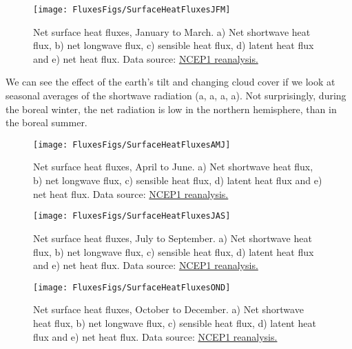 \begin{figure}[htb]
  \centering
  \texttt{[image: FluxesFigs/SurfaceHeatFluxesJFM]}
  \caption{Net surface heat fluxes, January to March.  a) Net shortwave heat flux, b) net longwave flux, c) sensible heat flux, d) latent heat flux and e) net heat flux. 
  Data source:  \href{https://psl.noaa.gov/data/gridded/data.ncep.reanalysis.derived.surfaceflux.html}{NCEP1 reanalysis.}  }
  \label{fig:SurfaceHeatFluxesJFM}
\end{figure}

We can see the effect of the earth's tilt and changing cloud cover if we look at seasonal averages of the shortwave radiation (a, a, a, a).  Not surprisingly, during the boreal winter, the net radiation is low in the northern hemisphere, than in the boreal summer.  

\begin{figure}[htb]
  \centering
  \texttt{[image: FluxesFigs/SurfaceHeatFluxesAMJ]}
  \caption{Net surface heat fluxes, April to June.  a) Net shortwave heat flux, b) net longwave flux, c) sensible heat flux, d) latent heat flux and e) net heat flux. 
  Data source:  \href{https://psl.noaa.gov/data/gridded/data.ncep.reanalysis.derived.surfaceflux.html}{NCEP1 reanalysis.}  }
  \label{fig:SurfaceHeatFluxesAMJ}
\end{figure}

\begin{figure}[htb]
  \centering
  \texttt{[image: FluxesFigs/SurfaceHeatFluxesJAS]}
  \caption{Net surface heat fluxes, July to September.  a) Net shortwave heat flux, b) net longwave flux, c) sensible heat flux, d) latent heat flux and e) net heat flux. 
  Data source:  \href{https://psl.noaa.gov/data/gridded/data.ncep.reanalysis.derived.surfaceflux.html}{NCEP1 reanalysis.}  }
  \label{fig:SurfaceHeatFluxesJAS}
\end{figure}

\begin{figure}[htb]
  \centering
  \texttt{[image: FluxesFigs/SurfaceHeatFluxesOND]}
  \caption{Net surface heat fluxes, October to December.  a) Net shortwave heat flux, b) net longwave flux, c) sensible heat flux, d) latent heat flux and e) net heat flux. 
  Data source:  \href{https://psl.noaa.gov/data/gridded/data.ncep.reanalysis.derived.surfaceflux.html}{NCEP1 reanalysis.}  }
  \label{fig:SurfaceHeatFluxesOND}
\end{figure}
\clearpage
